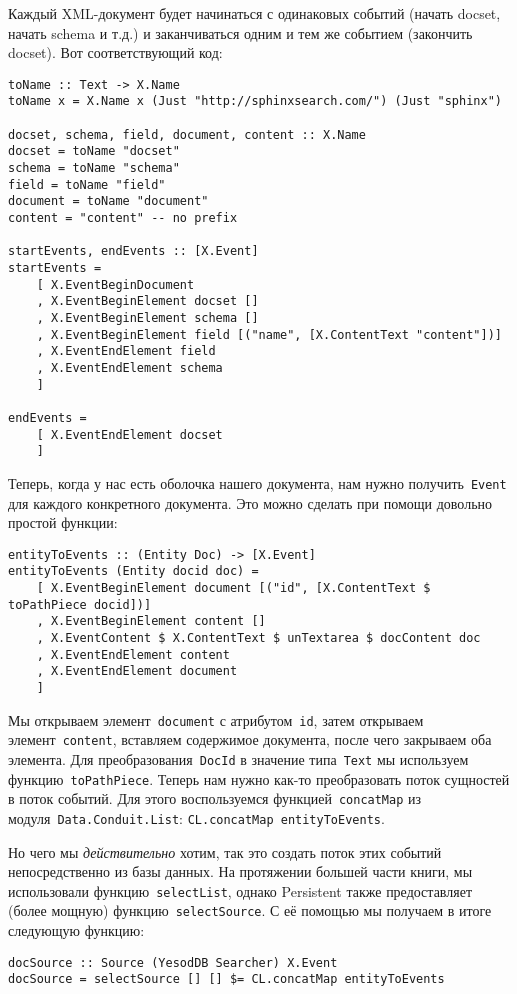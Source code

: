 Каждый XML-документ будет начинаться с одинаковых событий (начать docset, начать schema и т.д.) и заканчиваться одним и тем же событием (закончить docset). Вот соответствующий код:
\begin{lstlisting}
toName :: Text -> X.Name
toName x = X.Name x (Just "http://sphinxsearch.com/") (Just "sphinx")

docset, schema, field, document, content :: X.Name
docset = toName "docset"
schema = toName "schema"
field = toName "field"
document = toName "document"
content = "content" -- no prefix

startEvents, endEvents :: [X.Event]
startEvents =
    [ X.EventBeginDocument
    , X.EventBeginElement docset []
    , X.EventBeginElement schema []
    , X.EventBeginElement field [("name", [X.ContentText "content"])]
    , X.EventEndElement field
    , X.EventEndElement schema
    ]

endEvents =
    [ X.EventEndElement docset
    ]
\end{lstlisting}

Теперь, когда у нас есть оболочка нашего документа, нам нужно получить~\lstinline!Event! для каждого конкретного документа. Это можно сделать при помощи довольно простой функции:
\begin{lstlisting}
entityToEvents :: (Entity Doc) -> [X.Event]
entityToEvents (Entity docid doc) =
    [ X.EventBeginElement document [("id", [X.ContentText $ toPathPiece docid])]
    , X.EventBeginElement content []
    , X.EventContent $ X.ContentText $ unTextarea $ docContent doc
    , X.EventEndElement content
    , X.EventEndElement document
    ]
\end{lstlisting}

Мы открываем элемент~\lstinline'document' с атрибутом~\lstinline'id', затем открываем элемент~\lstinline'content', вставляем содержимое документа, после чего закрываем оба элемента. Для преобразования~\lstinline!DocId! в значение типа~\lstinline!Text! мы используем функцию~\lstinline!toPathPiece!. Теперь нам нужно как-то преобразовать поток сущностей в поток событий. Для этого воспользуемся функцией~\lstinline!concatMap! из модуля~\lstinline!Data.Conduit.List!: \lstinline`CL.concatMap entityToEvents`.

Но чего мы \emph{действительно} хотим, так это создать поток этих событий непосредственно из базы данных. На протяжении большей части книги, мы использовали функцию~\lstinline!selectList!, однако Persistent также предоставляет (более мощную) функцию~\lstinline!selectSource!. С её помощью мы получаем в итоге следующую функцию:
\begin{lstlisting}
docSource :: Source (YesodDB Searcher) X.Event
docSource = selectSource [] [] $= CL.concatMap entityToEvents
\end{lstlisting}%

